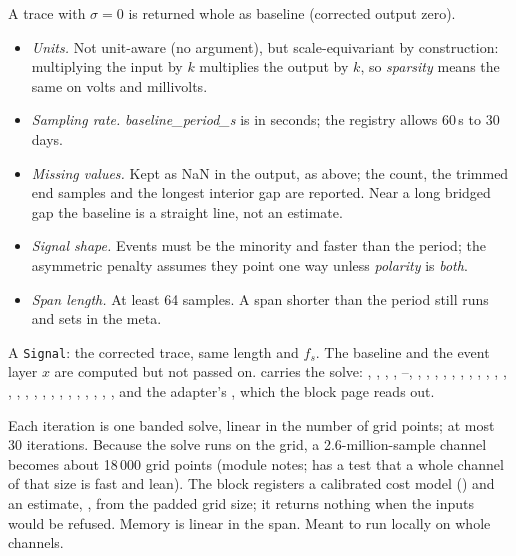 A trace with $\sigma = 0$ is returned whole as baseline (corrected output zero).

\begin{itemize}
\item \emph{Units.} Not unit-aware (no  argument), but scale-equivariant by
  construction: multiplying the input by $k$ multiplies the output by $k$, so \emph{sparsity}
  means the same on volts and millivolts.
\item \emph{Sampling rate.} \emph{baseline\_period\_s} is in seconds; the registry allows
  60\,s to 30 days.
\item \emph{Missing values.} Kept as NaN in the output, as above; the count, the trimmed end
  samples and the longest interior gap are reported. Near a long bridged gap the baseline is a
  straight line, not an estimate.
\item \emph{Signal shape.} Events must be the minority and faster than the period; the
  asymmetric penalty assumes they point one way unless \emph{polarity} is \emph{both}.
\item \emph{Span length.} At least 64 samples. A span shorter than the period still runs and
  sets  in the meta.
\end{itemize}

A \texttt{Signal}: the corrected trace, same length and $f_s$. The baseline and the event layer
$x$ are computed but not passed on.  carries the solve: ,
, , , --,
, , , ,
, , , ,
, , , ,
, , , ,
, , , ,
, , ,
, and the adapter's , which the block page reads out.

Each iteration is one banded solve, linear in the number of grid points; at most 30 iterations.
Because the solve runs on the grid, a 2.6-million-sample channel becomes about 18\,000 grid
points (module notes;  has a test that a whole channel of that size is
fast and lean). The block registers a calibrated cost model () and an
estimate, , from the padded grid size; it returns nothing when the inputs would
be refused. Memory is linear in the span. Meant to run locally on whole channels.

